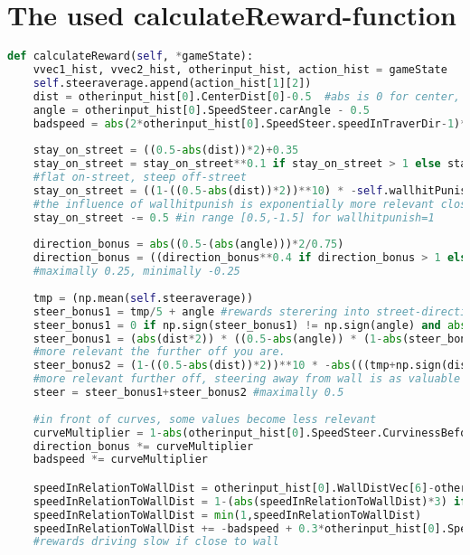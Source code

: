 \section{The used calculateReward-function}



\begin{lstlisting}[language=Python, frame=none]
def calculateReward(self, *gameState):
	vvec1_hist, vvec2_hist, otherinput_hist, action_hist = gameState
	self.steeraverage.append(action_hist[1][2]) 
	dist = otherinput_hist[0].CenterDist[0]-0.5  #abs is 0 for center, 0.15 for curb, 0.5 wall 
	angle = otherinput_hist[0].SpeedSteer.carAngle - 0.5
	badspeed = abs(2*otherinput_hist[0].SpeedSteer.speedInTraverDir-1)*5
	
	stay_on_street = ((0.5-abs(dist))*2)+0.35 
	stay_on_street = stay_on_street**0.1 if stay_on_street > 1 else stay_on_street**2 
	#flat on-street, steep off-street
	stay_on_street = ((1-((0.5-abs(dist))*2))**10) * -self.wallhitPunish + (1-(1-((0.5-abs(dist))*2))**10) * stay_on_street 
	#the influence of wallhitpunish is exponentially more relevant closer to the wall
	stay_on_street -= 0.5 #in range [0.5,-1.5] for wallhitpunish=1
	
	direction_bonus = abs((0.5-(abs(angle)))*2/0.75) 
	direction_bonus = ((direction_bonus**0.4 if direction_bonus > 1 else direction_bonus**2) / 1.1 / 2) - 0.25 #no big difference until 45degrees, then BIG diff.
	#maximally 0.25, minimally -0.25
	
	tmp = (np.mean(self.steeraverage)) 
	steer_bonus1 = tmp/5 + angle #rewards sterering into street-direction if the cars angle is off
	steer_bonus1 = 0 if np.sign(steer_bonus1) != np.sign(angle) and abs(angle) > 0.15 else steer_bonus1
	steer_bonus1 = (abs(dist*2)) * ((0.5-abs(angle)) * (1-abs(steer_bonus1))) + (1-abs(dist*2))*0.5  
	#more relevant the further off you are.
	steer_bonus2 = (1-((0.5-abs(dist))*2))**10 * -abs(((tmp+np.sign(dist))*np.sign(dist)))/1.5   
	#more relevant further off, steering away from wall is as valuable as doing nothing in center
	steer = steer_bonus1+steer_bonus2 #maximally 0.5
	
	#in front of curves, some values become less relevant
	curveMultiplier = 1-abs(otherinput_hist[0].SpeedSteer.CurvinessBeforeCar-0.5)
	direction_bonus *= curveMultiplier
	badspeed *= curveMultiplier 

	speedInRelationToWallDist = otherinput_hist[0].WallDistVec[6]-otherinput_hist[0].SpeedSteer.speedInStreetDir+(80/250)
	speedInRelationToWallDist = 1-(abs(speedInRelationToWallDist)*3) if speedInRelationToWallDist < 0 else (1-speedInRelationToWallDist)+0.33                                   
	speedInRelationToWallDist = min(1,speedInRelationToWallDist)
	speedInRelationToWallDist += -badspeed + 0.3*otherinput_hist[0].SpeedSteer.speedInStreetDir
	#rewards driving slow if close to wall
	

\end{lstlisting}
